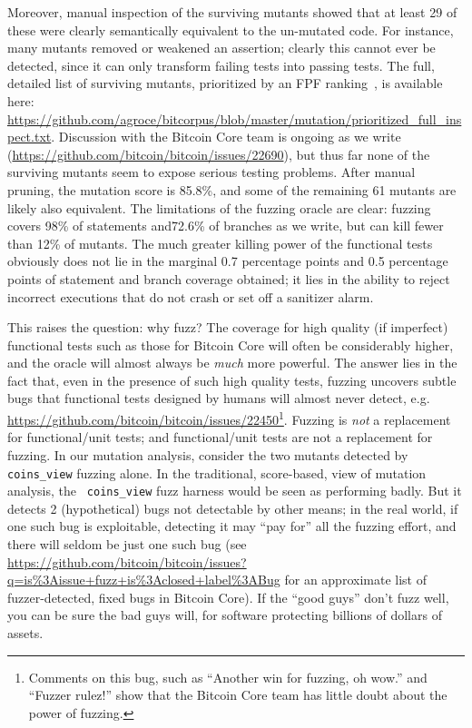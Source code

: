 Moreover, manual inspection of the surviving mutants showed that at
least 29 of these were clearly semantically equivalent to the
un-mutated code.  For instance, many mutants removed or weakened an
assertion; clearly this cannot ever be detected, since it can only
transform failing tests into passing tests.  The full, detailed list
of surviving mutants, prioritized by an FPF ranking~\cite{10.1145/2491956.2462173,Gonzalez85}, is
available here:
\url{https://github.com/agroce/bitcorpus/blob/master/mutation/prioritized_full_inspect.txt}.
Discussion with the Bitcoin Core team is ongoing as we write
(\url{https://github.com/bitcoin/bitcoin/issues/22690}), but thus far
none of the surviving mutants seem to expose serious testing
problems.  After manual pruning, the mutation score is 85.8\%, and
some of the remaining 61 mutants are likely also equivalent.  The
limitations of the fuzzing oracle are clear: fuzzing covers 98\% of
statements and72.6\% of branches as we write, but can kill fewer than
12\% of mutants.  The much greater killing power of the functional
tests obviously does not lie in the marginal 0.7 percentage points and 0.5
percentage points of statement and branch coverage obtained; it lies
in the ability to reject incorrect executions that do not crash or set
off a sanitizer alarm.

This raises the question:  why fuzz?  The coverage for high quality
(if imperfect) functional tests such as those for Bitcoin Core will
often be considerably
higher, and the oracle will almost always be \emph{much} more powerful.  The answer lies in the
fact that, even in the presence of such high quality tests, fuzzing
uncovers subtle bugs that functional tests designed by humans will
almost never detect,
e.g. \url{https://github.com/bitcoin/bitcoin/issues/22450}\footnote{Comments
  on this bug, such as ``Another win for fuzzing, oh wow.'' and
  ``Fuzzer rulez!'' show that the Bitcoin Core team has little doubt
  about the power of fuzzing.}.  Fuzzing is \emph{not} a replacement
for functional/unit tests; and functional/unit tests are not a
replacement for fuzzing.  In our mutation analysis, consider the two
mutants detected by {\tt coins\_view} fuzzing alone.  In the
traditional, score-based, view of mutation analysis, the {\tt
  coins\_view} fuzz harness would be seen as performing badly.  But it
detects 2 (hypothetical) bugs not detectable by other means; in the
real world, if one such bug is exploitable, detecting it may ``pay
for'' all the fuzzing effort, and there will seldom be just one such
bug (see
\url{https://github.com/bitcoin/bitcoin/issues?q=is\%3Aissue+fuzz+is\%3Aclosed+label\%3ABug}
for an approximate list of fuzzer-detected, fixed bugs in Bitcoin
Core).  If the ``good guys'' don't fuzz well, you can be sure the bad
guys will, for software protecting billions of dollars of assets.

